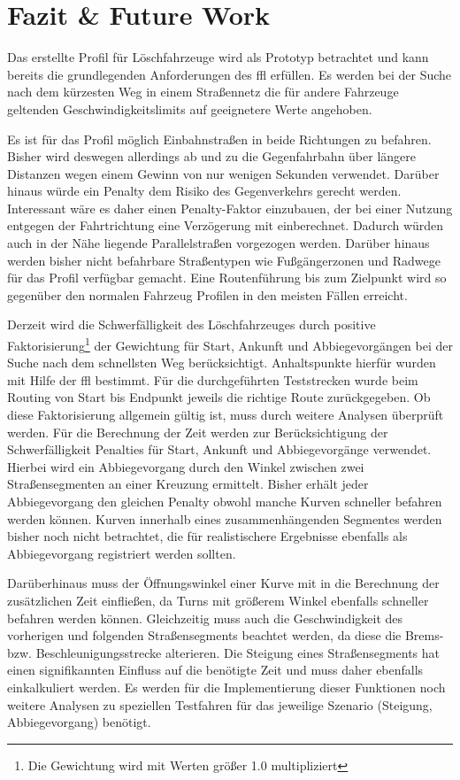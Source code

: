 \section{Fazit \& Future Work}

Das erstellte Profil für Löschfahrzeuge wird als Prototyp betrachtet und kann bereits die grundlegenden Anforderungen des \gls{ffl} erfüllen.
Es werden bei der Suche nach dem kürzesten Weg in einem Straßennetz die für andere Fahrzeuge geltenden Geschwindigkeitslimits auf geeignetere Werte angehoben.

Es ist für das Profil möglich Einbahnstraßen in beide Richtungen zu befahren.
Bisher wird deswegen allerdings ab und zu die Gegenfahrbahn über längere Distanzen wegen einem Gewinn von nur wenigen Sekunden verwendet.
Darüber hinaus würde ein Penalty dem Risiko des Gegenverkehrs gerecht werden.
Interessant wäre es daher einen Penalty-Faktor einzubauen, der bei einer Nutzung entgegen der Fahrtrichtung eine Verzögerung mit einberechnet.
Dadurch würden auch in der Nähe liegende Parallelstraßen vorgezogen werden.
Darüber hinaus werden bisher nicht befahrbare Straßentypen wie Fußgängerzonen und Radwege für das Profil verfügbar gemacht.
Eine Routenführung bis zum Zielpunkt wird so gegenüber den normalen Fahrzeug Profilen in den meisten Fällen erreicht.

Derzeit wird die Schwerfälligkeit des Löschfahrzeuges durch positive Faktorisierung\footnote{Die Gewichtung wird mit Werten größer 1.0 multipliziert} der Gewichtung für Start, Ankunft und Abbiegevorgängen bei der Suche nach dem schnellsten Weg berücksichtigt.
Anhaltspunkte hierfür wurden mit Hilfe der \gls{ffl} bestimmt.
Für die durchgeführten Teststrecken wurde beim Routing von Start bis Endpunkt jeweils die richtige Route zurückgegeben.
Ob diese Faktorisierung allgemein gültig ist, muss durch weitere Analysen überprüft werden.
Für die Berechnung der Zeit werden zur Berücksichtigung der Schwerfälligkeit Penalties für Start, Ankunft und Abbiegevorgänge verwendet.
Hierbei wird ein Abbiegevorgang durch den Winkel zwischen zwei Straßensegmenten an einer Kreuzung ermittelt.
Bisher erhält jeder Abbiegevorgang den gleichen Penalty obwohl manche Kurven schneller befahren werden können.
Kurven innerhalb eines zusammenhängenden Segmentes werden bisher noch nicht betrachtet, die für realistischere Ergebnisse ebenfalls als Abbiegevorgang registriert werden sollten.

Darüberhinaus muss der Öffnungswinkel einer Kurve mit in die Berechnung der zusätzlichen Zeit einfließen, da Turns mit größerem Winkel ebenfalls schneller befahren werden können.
Gleichzeitig muss auch die Geschwindigkeit des vorherigen und folgenden Straßensegments beachtet werden, da diese die Brems- bzw. Beschleunigungsstrecke alterieren.
Die Steigung eines Straßensegments hat einen signifikannten Einfluss auf die benötigte Zeit und muss daher ebenfalls einkalkuliert werden.
Es werden für die Implementierung dieser Funktionen noch weitere Analysen zu speziellen Testfahren für das jeweilige Szenario (Steigung, Abbiegevorgang) benötigt.


